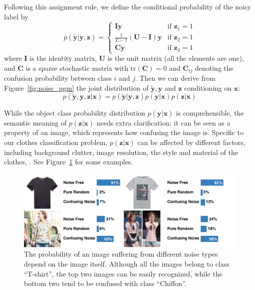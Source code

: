 \documentclass[10pt,twocolumn,letterpaper]{article}
\def\vec{\mathbf}
\def\mat{\mathbf}
\begin{document}
Following this assignment rule, we define the conditional probability of the noisy label by
\begin{equation} \label{eq:likelihood}
    p(\tilde{\vec{y}}|\vec{y},\vec{z}) = \begin{cases}
        \mat{I}\vec{y} & \text{if } \vec{z}_1 = 1 \\
        \frac{1}{L-1}(\mat{U} - \mat{I})\vec{y} & \text{if } \vec{z}_2 = 1 \\
        \mat{C}\vec{y} & \text{if } \vec{z}_3 = 1
    \end{cases}
\end{equation}
where $\mat{I}$ is the identity matrix, $\mat{U}$ is the unit matrix (all the elements are one), and $\mat{C}$ is a sparse stochastic matrix with $\mathrm{tr}(\mat{C})=0$ and $\mat{C}_{ij}$ denoting the confusion probability between class $i$ and $j$. Then we can derive from Figure~\ref{fig:noise_pgm} the joint distribution of $\tilde{\vec{y}}, \vec{y}$ and $\vec{z}$ conditioning on $\vec{x}$:
\begin{equation} \label{eq:joint_distribution}
  p(\tilde{\vec{y}}, \vec{y}, \vec{z} | \vec{x}) = p(\tilde{\vec{y}} | \vec{y}, \vec{z}) p(\vec{y} | \vec{x}) p(\vec{z} | \vec{x})
\end{equation}

While the object class probability distribution $p(\vec{y} | \vec{x})$ is comprehensible, the semantic meaning of $p(\vec{z} | \vec{x})$ needs extra clarification: it can be seen as a property of an image, which represents how confusing the image is. Specific to our clothes classification problem, $p(\vec{z} | \vec{x})$ can be affected by different factors, including background clutter, image resolution, the style and material of the clothes, \etc. See Figure~\ref{fig:compare_noise_level} for some examples.

\begin{figure}[t]
\begin{center}
\includegraphics[width=1.0\linewidth]{figure/noise_level.pdf}
\end{center}
\caption{The probability of an image suffering from different noise types depend on the image itself. Although all the images belong to class ``T-shirt'', the top two images can be easily recognized, while the bottom two tend to be confused with class ``Chiffon''.}
\label{fig:compare_noise_level}
\end{figure}
\end{document}
